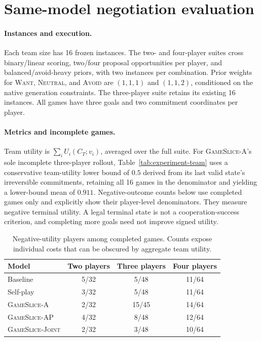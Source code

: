 \section{Same-model negotiation evaluation}
\label{app:team-benac}

\paragraph{Instances and execution.}
Each team size has 16 frozen instances. The two- and four-player suites cross
binary/linear scoring, two/four proposal opportunities per player, and
balanced/avoid-heavy priors, with two instances per combination. Prior
weights for \textsc{Want}, \textsc{Neutral}, and \textsc{Avoid} are
$(1,1,1)$ and $(1,1,2)$, conditioned on the native generation constraints.
The three-player suite retains its existing 16 instances. All games have
three goals and two commitment coordinates per player.

\paragraph{Metrics and incomplete games.}
Team utility is $\sum_i U_i(C_T;v_i)$, averaged over the full suite.
For \textsc{GameSlice-A}'s sole incomplete three-player rollout,
Table~\ref{tab:experiment-team} uses a conservative team-utility lower bound
of $0.5$ derived from its last valid state's irreversible commitments,
retaining all 16 games in the denominator and yielding a lower-bound mean
of $0.911$.
Negative-outcome counts below use completed games only and explicitly show
their player-level denominators. They measure negative terminal utility. A legal terminal state is not a cooperation-success
criterion, and completing more goals need not improve signed utility.

\begin{table}[h]
\caption{Negative-utility players among completed games. Counts expose
individual costs that can be obscured by aggregate team utility.}
\label{tab:team-negative}
\centering\small
\begin{tabular}{lccc}
\hline
Model & Two players & Three players & Four players \\
\hline
Baseline & 5/32 & 5/48 & 11/64 \\
Self-play & 3/32 & 5/48 & 11/64 \\
\textsc{GameSlice-A} & 2/32 & 15/45 & 14/64 \\
\textsc{GameSlice-AP} & 4/32 & 8/48 & 12/64 \\
\textsc{GameSlice-Joint} & 2/32 & 3/48 & 10/64 \\
\hline
\end{tabular}
\end{table}

